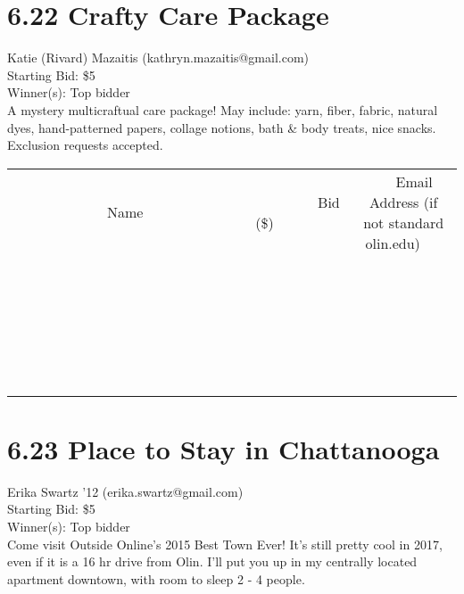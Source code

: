 \documentclass[11pt]{article}
\begin{document}
\section*{6.22 Crafty Care Package}
Katie (Rivard) Mazaitis (kathryn.mazaitis@gmail.com) \\
Starting Bid: \$5 \\
Winner(s): 
Top bidder \\
A mystery multicraftual care package! May include: yarn, fiber, fabric, natural dyes, hand-patterned papers, collage notions, bath \& body treats, nice snacks. Exclusion requests accepted. \\[6ex]
\begin{tabular}{c c c}
~~~~~~~~~~~~~Name~~~~~~~~~~~~~ & ~~~~~~~~~Bid (\$)~~~~~~~~~ & ~~~Email Address (if not standard olin.edu)~~~ \\
 & & \\
\hline
 & & \\
\hline
 & & \\
\hline
 & & \\
\hline
 & & \\
\hline
 & & \\
\hline
 & & \\
\hline
 & & \\
\hline
 & & \\
\hline
 & & \\
\hline
 & & \\
\hline
 & & \\
\hline
 & & \\
\hline
 & & \\
\hline
 & & \\
\hline
 & & \\
\hline
 & & \\
\hline
 & & \\
\hline
 & & \\
\hline
 & & \\
\hline
 & & \\
\hline
 & & \\
\hline
 & & \\
\hline
 & & \\
\hline
 & & \\
\hline
 & & \\
\hline
\end{tabular}
\clearpage
\section*{6.23 Place to Stay in Chattanooga}
Erika Swartz '12 (erika.swartz@gmail.com) \\
Starting Bid: \$5 \\
Winner(s): 
Top bidder \\
Come visit Outside Online's 2015 Best Town Ever! It's still pretty cool in 2017, even if it is a 16 hr drive from Olin. I'll put you up in my centrally located apartment downtown, with room to sleep 2 - 4 people. 
\end{document}
